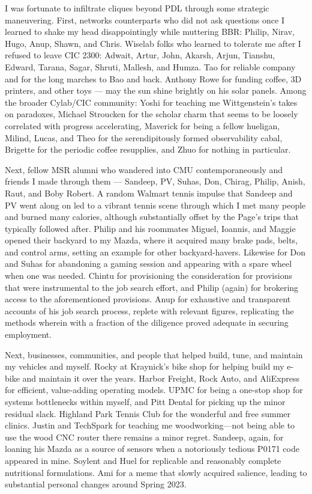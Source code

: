 I was fortunate to infiltrate cliques beyond PDL through some strategic maneuvering.
First, networks counterparts who did not ask questions once I learned to
shake my head disappointingly while muttering BBR: Philip, Nirav, Hugo, Anup, Shawn, and Chris.
Wiselab folks who learned to tolerate me after I refused to leave CIC 2300:
Adwait, Artur, John, Akarsh, Arjun, Tianshu, Edward, Tarana, Sagar, Shruti, Mallesh, and Humza.
Tao for reliable company and for the long marches to Bao and back.
Anthony Rowe for funding coffee, 3D printers, and other toys --- may the sun shine brightly
on his solar panels.
Among the broader Cylab/CIC community: Yoshi for teaching me
Wittgenstein's takes on paradoxes, Michael Stroucken for the scholar charm that
seems to be loosely correlated with progress accelerating, Maverick for being a fellow
hueligan, Milind, Lucas, and Theo for the serendipitously formed observability cabal,
Brigette for the periodic coffee resupplies,
and Zhuo for nothing in particular.

Next, fellow MSR alumni who wandered into CMU contemporaneously and friends I made through them
--- Sandeep, PV, Suhas, Don, Chirag, Philip, Anish, Raut, and Boby Robert.
A random Walmart tennis impulse that Sandeep and PV went along on led to a vibrant tennis scene
through which I met many people and burned
many calories, although substantially offset by the Page's trips that typically followed after.
Philip and his roommates Miguel, Ioannis, and Maggie opened their backyard to my Mazda, where it
acquired many brake pads, belts,
and control arms, setting an example for other backyard-havers.
Likewise for Don and Suhas for abandoning a gaming session and appearing with a spare wheel
when one was needed.
Chintu for provisioning the consideration for provisions that were instrumental to the
job search effort,
and Philip (again) for brokering access to the aforementioned provisions.
Anup for exhaustive and transparent accounts of his job search process, replete with relevant
figures, replicating the methods wherein with a fraction of the diligence proved adequate in
securing employment.

Next, businesses, communities, and people that helped build, tune, and maintain my vehicles and
myself.
Rocky at Kraynick's bike shop for helping build my e-bike and maintain it over the years.
Harbor Freight, Rock Auto, and AliExpress for efficient, value-adding operating models.
UPMC for being a one-stop shop
for systems bottlenecks within myself, and Pitt Dental for picking up the minor residual slack.
Highland Park Tennis Club for the wonderful and free summer clinics.
Justin and TechSpark for teaching me
woodworking---not being able to use the wood CNC router there remains a minor regret.
Sandeep, again, for loaning his Mazda as a source of sensors when a notoriously tedious P0171
code appeared
in mine.
Soylent and Huel for replicable and reasonably complete nutritional formulations.
Ami for a meme that slowly acquired salience, leading to substantial personal changes around Spring
2023.

